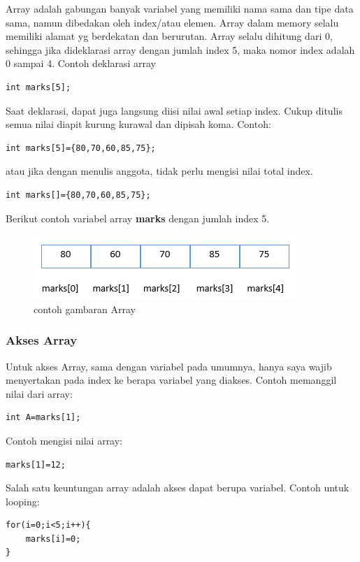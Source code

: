 \documentclass[12pt,]{article}
\begin{document}
	Array adalah gabungan banyak variabel yang memiliki nama sama dan tipe data sama, namun dibedakan oleh index/atau elemen.
	Array dalam memory selalu memiliki alamat yg berdekatan dan berurutan.
	Array selalu dihitung dari 0, sehingga jika dideklarasi array dengan jumlah index 5, maka nomor index adalah 0 sampai 4.
	Contoh deklarasi array
\begin{verbatim}
int marks[5];
\end{verbatim}
	Saat deklarasi, dapat juga langsung diisi nilai awal setiap index.
	Cukup ditulis semua nilai diapit kurung kurawal dan dipisah koma.
	Contoh:
\begin{verbatim}
int marks[5]={80,70,60,85,75};
\end{verbatim}
	atau jika dengan menulis anggota, tidak perlu mengisi nilai total index.
	\begin{verbatim}
int marks[]={80,70,60,85,75};
	\end{verbatim}
	
	Berikut contoh variabel array \textbf{marks} dengan jumlah index 5.
	
	\begin{figure}[H]
		\centering
		\includegraphics[width=0.35\linewidth]{images/array}
		\caption{contoh gambaran Array}
	\end{figure}
	
	\subsubsection{Akses Array}
	
	Untuk akses Array, sama dengan variabel pada umumnya, hanya saya wajib menyertakan pada index ke berapa variabel yang diakses.
	Contoh memanggil nilai dari array:
	\begin{verbatim}
int A=marks[1];
	\end{verbatim}
	
	Contoh mengisi nilai array:
	\begin{verbatim}
marks[1]=12;
	\end{verbatim}
	
	Salah satu keuntungan array adalah akses dapat berupa variabel.
	Contoh untuk looping:
	\begin{verbatim}
for(i=0;i<5;i++){
	marks[i]=0;
}
	\end{verbatim}
	
\end{document}
